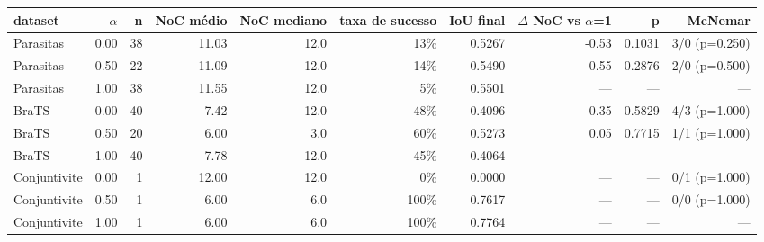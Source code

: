 \begin{tabular}{lrrrrrrrrr}
\hline
dataset & $\alpha$ & n & NoC médio & NoC mediano & taxa de sucesso & IoU final & $\Delta$ NoC vs $\alpha$=1 & p & McNemar \\
\hline
Parasitas & 0.00 & 38 & 11.03 & 12.0 & 13\% & 0.5267 & -0.53 & 0.1031 & 3/0 (p=0.250) \\
Parasitas & 0.50 & 22 & 11.09 & 12.0 & 14\% & 0.5490 & -0.55 & 0.2876 & 2/0 (p=0.500) \\
Parasitas & 1.00 & 38 & 11.55 & 12.0 & 5\% & 0.5501 & --- & --- & --- \\
BraTS & 0.00 & 40 & 7.42 & 12.0 & 48\% & 0.4096 & -0.35 & 0.5829 & 4/3 (p=1.000) \\
BraTS & 0.50 & 20 & 6.00 & 3.0 & 60\% & 0.5273 & 0.05 & 0.7715 & 1/1 (p=1.000) \\
BraTS & 1.00 & 40 & 7.78 & 12.0 & 45\% & 0.4064 & --- & --- & --- \\
Conjuntivite & 0.00 & 1 & 12.00 & 12.0 & 0\% & 0.0000 & --- & --- & 0/1 (p=1.000) \\
Conjuntivite & 0.50 & 1 & 6.00 & 6.0 & 100\% & 0.7617 & --- & --- & 0/0 (p=1.000) \\
Conjuntivite & 1.00 & 1 & 6.00 & 6.0 & 100\% & 0.7764 & --- & --- & --- \\
\hline
\end{tabular}
